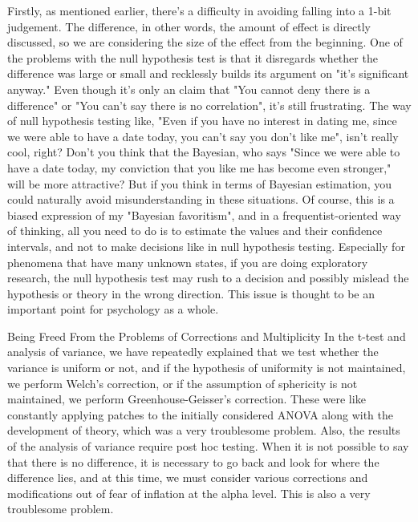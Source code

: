 \documentclass{ltjbook}
\begin{document}
Firstly, as mentioned earlier, there's a difficulty in avoiding falling into a 1-bit judgement. The difference, in other words, the amount of effect is directly discussed, so we are considering the size of the effect from the beginning. One of the problems with the null hypothesis test is that it disregards whether the difference was large or small and recklessly builds its argument on "it's significant anyway." Even though it's only an claim that "You cannot deny there is a difference" or "You can't say there is no correlation", it's still frustrating. The way of null hypothesis testing like, "Even if you have no interest in dating me, since we were able to have a date today, you can't say you don't like me", isn't really cool, right? Don't you think that the Bayesian, who says "Since we were able to have a date today, my conviction that you like me has become even stronger," will be more attractive? But if you think in terms of Bayesian estimation, you could naturally avoid misunderstanding in these situations. Of course, this is a biased expression of my "Bayesian favoritism", and in a frequentist-oriented way of thinking, all you need to do is to estimate the values and their confidence intervals, and not to make decisions like in null hypothesis testing. Especially for phenomena that have many unknown states, if you are doing exploratory research, the null hypothesis test may rush to a decision and possibly mislead the hypothesis or theory in the wrong direction. This issue is thought to be an important point for psychology as a whole.

Being Freed From the Problems of Corrections and Multiplicity
In the t-test and analysis of variance, we have repeatedly explained that we test whether the variance is uniform or not, and if the hypothesis of uniformity is not maintained, we perform Welch's correction, or if the assumption of sphericity is not maintained, we perform Greenhouse-Geisser's correction. These were like constantly applying patches to the initially considered ANOVA along with the development of theory, which was a very troublesome problem. Also, the results of the analysis of variance require post hoc testing. When it is not possible to say that there is no difference, it is necessary to go back and look for where the difference lies, and at this time, we must consider various corrections and modifications out of fear of inflation at the alpha level. This is also a very troublesome problem.
\end{document}
